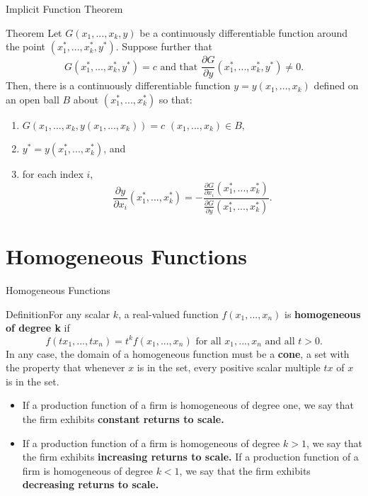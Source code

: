 \documentclass{beamer}
\begin{document}
\begin{frame}{Implicit Function Theorem}
\begin{block}{Theorem}
Let $G(x_1,..., x_k, y)$ be a continuously differentiable function around the point $(x_1^*,..., x_k^*, y^*)$. Suppose further that 
\[G(x_1^*,..., x_k^*, y^*)=c
\text{ and that }
\frac{\partial G}{\partial y} (x_1^*,..., x_k^*, y^*)\neq 0. 
\]
Then, there is a continuously differentiable function $y=y(x_1,..., x_k)$ defined on an open ball $B$ about $(x_1^*,..., x_k^*)$ so that:
\begin{enumerate}
    \item $G(x_1,..., x_k, y(x_1,..., x_k))=c$  $(x_1,..., x_k)\in B,$
    \item $y^*=y(x_1^*,..., x_k^*)$, and
    \item for each index $i$, 
    \[\frac{\partial y}{\partial x_i}(x_1^*,..., x_k^*)=-\frac{\frac{\partial G}{\partial x_i}(x_1^*,..., x_k^*)}{\frac{\partial G}{\partial y}(x_1^*,..., x_k^*)}.
    \]
\end{enumerate}
\end{block}
    
\end{frame}
\section{Homogeneous Functions}
\begin{frame}{Homogeneous Functions}
\begin{block}
    {Definition}For any scalar $k$, a real-valued function $f(x_1,..., x_n)$ is \textbf{homogeneous of degree k} if 
\[f(tx_1,...,tx_n)=t^kf(x_1,..., x_n) \text{ for all }x_1,..., x_n \text{ and all }t>0.
\]
In any case, the domain of a homogeneous function must be a \textbf{cone}, a set with the property that whenever $x$ is in the set, every positive scalar multiple $tx$ of $x$ is in the set. 
\end{block}
    \begin{itemize}
        \item If a production function of a firm is homogeneous of degree one, we say that the firm exhibits \textbf{constant returns to scale.}
        \item If a production function of a firm is homogeneous of degree $k>1$, we say that the firm exhibits \textbf{increasing returns to scale.}
        If a production function of a firm is homogeneous of degree $k<1$, we say that the firm exhibits \textbf{decreasing returns to scale.}
    \end{itemize}
    
    
    
\end{frame}
\end{document}

